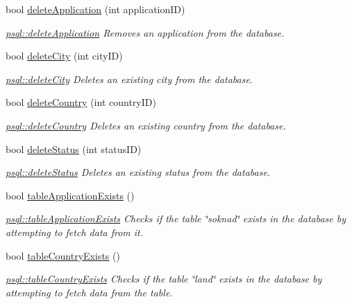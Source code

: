 \begin{DoxyCompactItemize}
bool \mbox{\hyperlink{classpsql_a999ee8e2d813892411ef502ebc055a79}{delete\+Application}} (int application\+ID)
\begin{DoxyCompactList}\small\item\em \mbox{\hyperlink{classpsql_a999ee8e2d813892411ef502ebc055a79}{psql\+::delete\+Application}} Removes an application from the database. \end{DoxyCompactList}\item 
bool \mbox{\hyperlink{classpsql_aaffd42b26b635d9881daaf5fbf4fd62f}{delete\+City}} (int city\+ID)
\begin{DoxyCompactList}\small\item\em \mbox{\hyperlink{classpsql_aaffd42b26b635d9881daaf5fbf4fd62f}{psql\+::delete\+City}} Deletes an existing city from the database. \end{DoxyCompactList}\item 
bool \mbox{\hyperlink{classpsql_a914bf8701fbed4ff80edcd0d09c7c3fd}{delete\+Country}} (int country\+ID)
\begin{DoxyCompactList}\small\item\em \mbox{\hyperlink{classpsql_a914bf8701fbed4ff80edcd0d09c7c3fd}{psql\+::delete\+Country}} Deletes an existing country from the database. \end{DoxyCompactList}\item 
bool \mbox{\hyperlink{classpsql_a26fc592cfb9f484e1bee62af527f2b95}{delete\+Status}} (int status\+ID)
\begin{DoxyCompactList}\small\item\em \mbox{\hyperlink{classpsql_a26fc592cfb9f484e1bee62af527f2b95}{psql\+::delete\+Status}} Deletes an existing status from the database. \end{DoxyCompactList}\item 
bool \mbox{\hyperlink{classpsql_a117b616053845f1b7295b21a06f008fd}{table\+Application\+Exists}} ()
\begin{DoxyCompactList}\small\item\em \mbox{\hyperlink{classpsql_a117b616053845f1b7295b21a06f008fd}{psql\+::table\+Application\+Exists}} Checks if the table \char`\"{}soknad\char`\"{} exists in the database by attempting to fetch data from it. \end{DoxyCompactList}\item 
bool \mbox{\hyperlink{classpsql_ae0ab0012c58471bd3fd63c286fb22224}{table\+Country\+Exists}} ()
\begin{DoxyCompactList}\small\item\em \mbox{\hyperlink{classpsql_ae0ab0012c58471bd3fd63c286fb22224}{psql\+::table\+Country\+Exists}} Checks if the table \char`\"{}land\char`\"{} exists in the database by attempting to fetch data fram the table. \end{DoxyCompactList}\item 

\end{DoxyCompactItemize}
